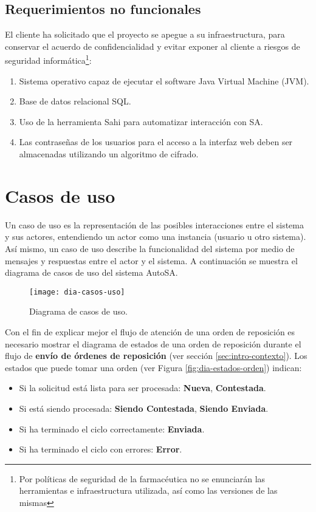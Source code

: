 \subsection{Requerimientos no funcionales}\label{sec:nonfunctional-req}
El cliente ha solicitado que el proyecto se apegue a su infraestructura, para conservar el acuerdo de confidencialidad y evitar exponer al cliente a riesgos de seguridad informática\footnote{Por políticas de seguridad de la farmacéutica no se enunciarán las herramientas e infraestructura utilizada, así como las versiones de las mismas}:
\begin{enumerate}
\item Sistema operativo capaz de ejecutar el software Java Virtual Machine (JVM).
\item Base de datos relacional SQL.
\item Uso de la herramienta Sahi para automatizar interacción con SA.
\item Las contraseñas de los usuarios para el acceso a la interfaz web deben ser almacenadas utilizando un algoritmo de cifrado.
\end{enumerate}




\section{Casos de uso}
Un caso de uso es la representación de las posibles interacciones entre el sistema y sus actores, entendiendo un actor como una instancia (usuario u otro sistema). Así mismo, un caso de uso describe la funcionalidad del sistema por medio de mensajes y respuestas entre el actor y el sistema\cite{ApressSE}. A continuación se muestra el diagrama de casos de uso del sistema AutoSA.

\begin{figure}[h]
  \centering
  \texttt{[image: dia-casos-uso]} 
  \caption{Diagrama de casos de uso.}
  \label{fig:dia-casos-uso}
\end{figure}

Con el fin de explicar mejor el flujo de atención de una orden de reposición es necesario mostrar el diagrama de estados de una orden de reposición durante el flujo de \textbf{envío de órdenes de reposición} (ver sección \ref{sec:intro-contexto}). Los estados que puede tomar una orden (ver Figura \ref{fig:dia-estados-orden}) indican:
\begin{itemize}
  \item Si la solicitud está lista para ser procesada: \textbf{Nueva}, \textbf{Contestada}.
  \item Si está siendo procesada: \textbf{Siendo Contestada}, \textbf{Siendo Enviada}.
  \item Si ha terminado el ciclo correctamente: \textbf{Enviada}.
  \item Si ha terminado el ciclo con errores: \textbf{Error}.
\end{itemize} 

